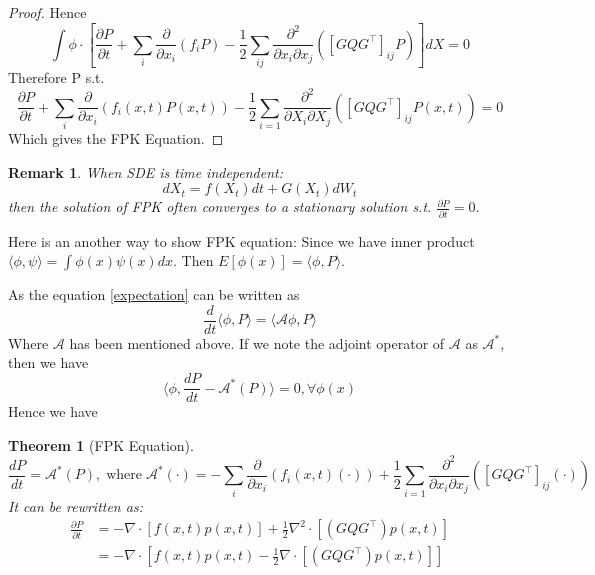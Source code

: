 \documentclass{article}
\newtheorem{theorem}{Theorem}
\newtheorem{remark}{Remark}
\begin{document}
\begin{proof}
    Hence $$\int \phi \cdot\left[\frac{\partial P}{\partial t}+\sum_{i} \frac{\partial}{\partial x_{i}}\left(f_{i} P\right)-\frac{1}{2} \sum_{i j} \frac{\partial^{2}}{\partial x_{i} \partial x_{j}}\left(\left[G Q G^{\top}\right]_{i j} P\right)\right] d X=0$$
    Therefore P s.t.    
    \begin{equation}
        \frac{\partial P}{\partial t}+\sum_{i} \frac{\partial}{\partial x_{i}}\left(f_{i}(x, t) P(x, t)\right)-\frac{1}{2} \sum_{i=1} \frac{\partial^{2}}{\partial X_{i} \partial X_{j}}\left(\left[G Q G^{\top}\right]_{i j} P\left(x,t\right)\right)=0
    \end{equation}
    Which gives the FPK Equation.
\end{proof}

\begin{remark}
    When SDE is time independent:  
    \begin{equation}
        d X_t=f(X_t) d t+G(X_t) d W_{t}  
    \end{equation}
    then the solution of FPK often converges to a stationary solution s.t.  $\frac{\partial P}{\partial t}=0$.
\end{remark}
Here is an another way to show FPK equation: Since we have inner product $\langle\phi, \psi\rangle=\int \phi(x)\psi(x)dx$. Then $E[\phi(x)]=\langle\phi, P\rangle$.

As the equation \ref{expectation} can be written as 
\begin{equation}
    \frac{d}{dt}\langle\phi, P\rangle=\langle\mathcal{A}\phi, P\rangle
\end{equation}
Where $\mathcal{A}$ has been mentioned above. If we note the adjoint operator of $\mathcal{A}$ as $\mathcal{A}^*$, then we have
\begin{equation}
    \langle\phi, \frac{dP}{dt}-\mathcal{A}^*(P)\rangle=0,\forall \phi(x)
\end{equation}
Hence we have 
\begin{theorem}[FPK Equation]
    \begin{equation}
    \frac{dP}{dt}=\mathcal{A}^*(P),\operatorname{where} \mathcal{A}^*(\cdot)=-\sum_{i} \frac{\partial}{\partial x_{i}}\left(f_{i}(x, t) (\cdot)\right)+\frac{1}{2} \sum_{i=1} \frac{\partial^{2}}{\partial x_{i} \partial x_{j}}\left(\left[G Q G^{\top}\right]_{i j}(\cdot)\right)
\end{equation}
It can be rewritten as:
\begin{equation}
    \begin{aligned}
        \frac{\partial P}{\partial t} &= -\nabla\cdot\left[f(x, t) p(x, t)\right]+\frac{1}{2} \nabla^2\cdot\left[\left(G Q G^{\top}\right) p(x, t)\right] \\
        &=-\nabla\cdot\left[f(x, t) p(x, t)-\frac{1}{2} \nabla\cdot\left[\left(G Q G^{\top}\right) p(x, t)\right]\right]
    \end{aligned}
\end{equation}
\end{theorem}
\end{document}
